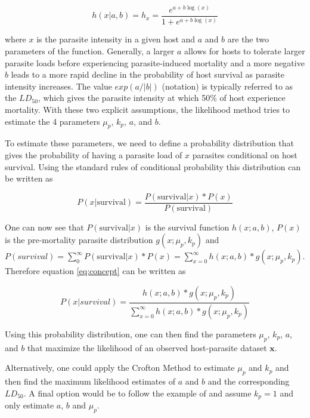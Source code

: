 \documentclass[12pt, a4paper]{article}
\begin{document}
\begin{equation}
    h(x | a, b) = h_x = \dfrac{e^{a + b \log(x)}}{1 + e^{a + b \log(x)}}
    \label{eq:logistic}
\end{equation}

where $x$ is the parasite intensity in a given host and $a$ and $b$ are the two parameters of the function. Generally, a larger $a$ allows for hosts to tolerate larger parasite loads before experiencing parasite-induced mortality and a more negative $b$ leads to a more rapid decline in the probability of host survival as parasite intensity increases.  The value $exp(a / |b|)$ (notation) is typically referred to as the $LD_50$, which gives the parasite intensity at which 50\% of host experience mortality.  With these two explicit assumptions, the likelihood method tries to estimate the 4 parameters $\mu_p$, $k_p$, $a$, and $b$.

To estimate these parameters, we need to define a probability distribution that gives the probability of having a parasite load of $x$ parasites conditional on host survival.  Using the standard rules of conditional probability this distribution can be written as

\begin{equation}
    P(x | \text{survival}) = \dfrac{P(\text{survival} | x) * P(x)}{P(\text{survival})}
    \label{eq:concept}
\end{equation}

One can now see that $P(\text{survival} | x)$ is the survival function $h(x; a, b)$, $P(x)$ is the pre-mortality parasite distribution $g(x; \mu_p, k_p)$ and $P(survival) = \sum_0^{\infty} P(\text{survival} | x) * P(x) =  \sum_{x=0}^{\infty} h(x; a, b)  * g(x; \mu_p, k_p)$. Therefore equation \ref{eq:concept} can be written as

\begin{equation}
    P(x | survival) = \dfrac{h(x; a, b)  * g(x; \mu_p, k_p)}{\sum_{x=0}^{\infty} h(x; a, b)  * g(x; \mu_p, k_p)}
    \label{eq:dist}
\end{equation}

Using this probability distribution, one can then find the parameters $\mu_p$, $k_p$, $a$, and $b$ that maximize the likelihood of an observed host-parasite dataset $\mathbf{x}$.

Alternatively, one could apply the Crofton Method to estimate $\mu_p$ and $k_p$ and then find the maximum likelihood estimates of $a$ and $b$ and the corresponding $LD_{50}$.  A final option would be to follow the example of \citep{Ferguson2011} and assume $k_p = 1$ and only estimate $a$, $b$ and $\mu_p$.
\end{document}
